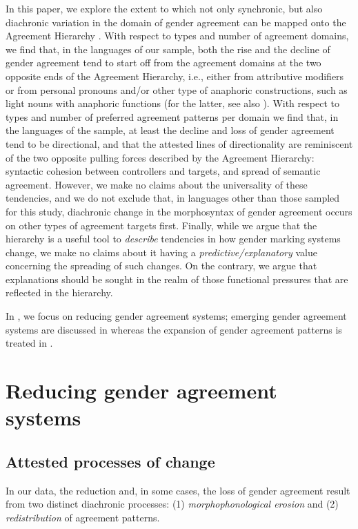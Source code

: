 \documentclass[output=collectionpaper]{langsci/langscibook}
\begin{document}
In this paper, we explore the extent to which not only synchronic, but also diachronic variation in the domain of gender agreement can be mapped onto the Agreement Hierarchy \citep[for an overview of the role of the Agreement Hierarchy in the diachrony of nominal classification see also][]{Seifart2010}.  With respect to types and number of agreement domains, we find that, in the languages of our sample, both the rise and the decline of gender agreement tend to start off from the agreement domains at the two opposite ends of the Agreement Hierarchy, i.e., either from attributive modifiers or from personal pronouns and/or other type of anaphoric constructions, such as light nouns with anaphoric functions (for the latter, see also ). With respect to types and number of preferred agreement patterns per domain we find that, in the languages of the sample, at least the decline and loss of gender agreement tend to be directional, and that the attested lines of directionality are reminiscent of the two opposite pulling forces described by the Agreement Hierarchy: syntactic cohesion between controllers and targets, and spread of semantic agreement. However, we make no claims about the universality of these tendencies, and we do not exclude that, in languages other than those sampled for this study, diachronic change in the morphosyntax of gender agreement occurs on other types of agreement targets first. Finally, while we argue that the hierarchy is a useful tool to \textit{describe} tendencies in how gender marking systems change, we make no claims about it having a \textit{predictive/explanatory} value concerning the spreading of such changes. On the contrary, we argue that explanations should be sought in the realm of those functional pressures that are reflected in the hierarchy.


In , we focus on reducing gender agreement systems; emerging gender agreement systems are discussed in  whereas the expansion of gender agreement patterns is treated in .


\section{Reducing gender agreement systems}
\label{subsec:Reducing}
\largerpage
\subsection{Attested processes of change}
In our data, the reduction and, in some cases, the loss of gender agreement result from two distinct diachronic processes: (1) \textit{morphophonological erosion} and (2) \textit{redistribution} of agreement patterns.
\end{document}

